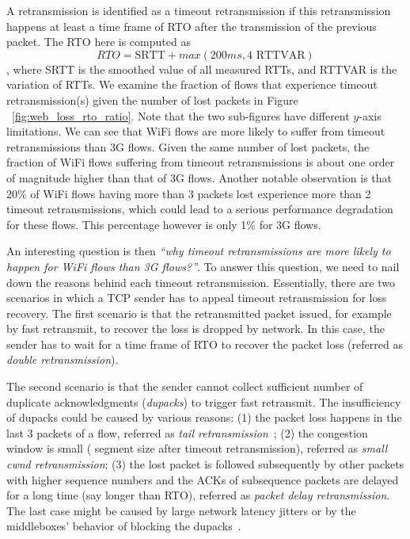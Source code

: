 A retransmission is identified as a timeout retransmission if this retransmission happens at least a time frame of RTO after the transmission of the previous packet. The RTO here is computed as \cite{rfc62982011computing} $$RTO=\text{SRTT} + max(200ms, 4 \text{ RTTVAR})$$, where SRTT is the smoothed value of all measured RTTs, and RTTVAR is the variation of RTTs. We examine the fraction of flows that experience timeout retransmission(s) given the number of lost packets in Figure ~\ref{fig:web_loss_rto_ratio}. Note that the two sub-figures have different $y$-axis limitations. We can see that WiFi flows are more likely to suffer from timeout retransmissions than 3G flows. Given the same number of lost packets, the fraction of WiFi flows suffering from timeout retransmissions is about one order of magnitude higher than that of 3G flows. Another notable observation is that 20\% of WiFi flows having more than 3 packets lost experience more than 2 timeout retransmissions, which could lead to a serious performance degradation for these flows. This percentage however is only 1\% for 3G flows. 

An interesting question is then \textit{``why timeout retransmissions are more likely to happen for WiFi flows than 3G flows?''}. To answer this question, we need to nail down the reasons behind each timeout retransmission. Essentially, there are two scenarios in which a TCP sender has to appeal timeout retransmission for loss recovery. The first scenario is that the retransmitted packet issued, for example by fast retransmit, to recover the loss is dropped by network. In this case, the sender has to wait for a time frame of RTO to recover the packet loss (referred as \emph{double retransmission}). 

The second scenario is that the sender cannot collect sufficient number of duplicate acknowledgments (\emph{dupacks}) to trigger fast retransmit. The insufficiency of dupacks could be caused by various reasons: (1) the packet loss happens in the last 3 packets of a flow, referred as \emph{tail retransmission}~\cite{flach2013reducing}; (2) the congestion window is small ( segment size after timeout retransmission), referred as \emph{small cwnd retransmission}; (3) the lost packet is followed subsequently by other packets with higher sequence numbers and the ACKs of subsequence packets are delayed for a long time (say longer than RTO), referred as \emph{packet delay retransmission}. The last case might be caused by large network latency jitters or by the middleboxes' behavior of blocking the dupacks~\cite{honda2011isit}. 


